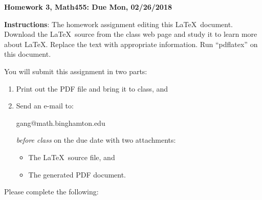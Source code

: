 \documentclass[11pt]{article}
\begin{document}
\begin{title}
	{\Large\bf Homework 3, Math455: Due Mon, 02/26/2018}
\end{title}

\author{\bf Your Name: ... (replace this)}

\maketitle
{\bf Instructions}:  The homework assignment editing this \LaTeX\ document.  Download the \LaTeX\ source from the class web page and study
it to learn more about \LaTeX.  Replace the text with appropriate information.  Run ``pdflatex'' on this document.

You will submit this assignment in two parts:
\begin{enumerate}
\item Print out the PDF file and bring it to class, and
\item Send an e-mail to:
\begin{center}
gang@math.binghamton.edu
\end{center}
\emph{before class} on the due date with two attachments:
\begin{itemize}
\item The \LaTeX\ source file, and
\item The generated PDF document.
\end{itemize}
\end{enumerate}
\newpage
Please complete the following:
\end{document}

